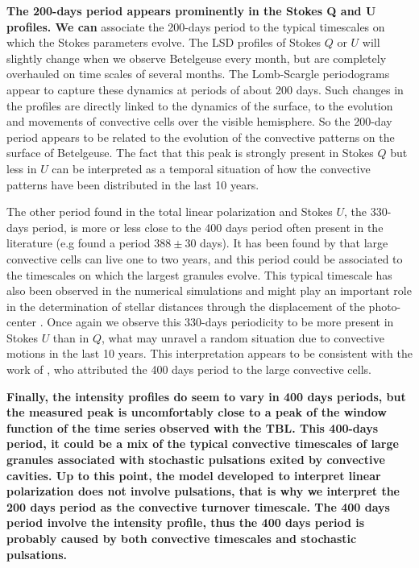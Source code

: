 \documentclass{aa}
\begin{document}
\textbf{The 200-days period appears prominently in the Stokes Q and U profiles. We can }
associate the 200-days period to the typical timescales on which the Stokes parameters evolve. 
The LSD profiles of Stokes $Q$ or $U$ will slightly change when we observe Betelgeuse every month, but are completely overhauled 
on time scales of several months. The Lomb-Scargle periodograms appear to capture these dynamics at periods of about 200 days.
 Such changes in the profiles are directly linked to the dynamics of the surface,  to  the evolution and movements 
of convective cells over the visible hemisphere. So the 200-day period appears to be related to the evolution of the convective patterns 
on the surface of Betelgeuse.  The fact that this peak is strongly present in Stokes $Q$ but less in $U$ 
can be interpreted as a temporal situation of how the convective patterns have been distributed in the last 10 years.

The other period found in the total linear polarization and Stokes $U$, the 330-days period, is more or less close to the 400 days period 
often present in the literature (e.g \cite{kiss_variability_2006} found a period $388 \pm 30$ days). It has been found
by \cite{lopez_ariste_convective_2018} that large convective cells can live  one  to two years, and this period could be associated to the 
timescales on which the largest granules evolve. This typical timescale has also been observed in the numerical simulations and might 
play an important role in the determination of stellar distances through the displacement of the photo-center \citep{chiavassa_probing_2022}. 
Once again we observe this 330-days periodicity to be more present in Stokes $U$ than in $Q$, what may unravel a 
random situation due to convective motions in the last 10 years. This interpretation appears to be  consistent with the work of \cite{gray_mass_2008}, 
who attributed the 400 days period to the large convective cells.  

\textbf{Finally, the intensity profiles do  seem to vary in  400 days periods, but the measured peak is uncomfortably close to a 
peak of the window function of the time series observed with the TBL. This 400-days period, it could be a mix of the typical convective 
timescales of large granules associated with stochastic pulsations exited by convective cavities. Up to this point, the model developed to 
interpret linear polarization does not involve pulsations, that is why we interpret the 200 days period as the convective turnover timescale. 
The 400 days period involve the intensity profile, thus the 400 days period is probably caused by both convective timescales and stochastic 
pulsations.}
\end{document}
